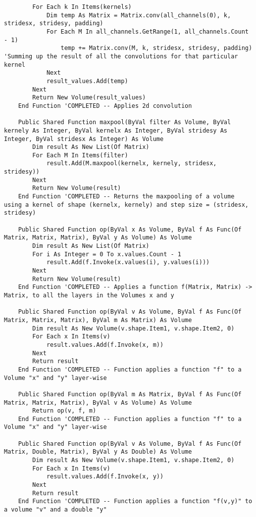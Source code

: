 \begin{verbatim}
        For Each k In Items(kernels)
            Dim temp As Matrix = Matrix.conv(all_channels(0), k, stridesx, stridesy, padding)
            For Each M In all_channels.GetRange(1, all_channels.Count - 1)
                temp += Matrix.conv(M, k, stridesx, stridesy, padding) 'Summing up the result of all the convolutions for that particular kernel
            Next
            result_values.Add(temp)
        Next
        Return New Volume(result_values)
    End Function 'COMPLETED -- Applies 2d convolution

    Public Shared Function maxpool(ByVal filter As Volume, ByVal kernely As Integer, ByVal kernelx As Integer, ByVal stridesy As Integer, ByVal stridesx As Integer) As Volume
        Dim result As New List(Of Matrix)
        For Each M In Items(filter)
            result.Add(M.maxpool(kernelx, kernely, stridesx, stridesy))
        Next
        Return New Volume(result)
    End Function 'COMPLETED -- Returns the maxpooling of a volume using a kernel of shape (kernelx, kernely) and step size = (stridesx, stridesy)

    Public Shared Function op(ByVal x As Volume, ByVal f As Func(Of Matrix, Matrix, Matrix), ByVal y As Volume) As Volume
        Dim result As New List(Of Matrix)
        For i As Integer = 0 To x.values.Count - 1
            result.Add(f.Invoke(x.values(i), y.values(i)))
        Next
        Return New Volume(result)
    End Function 'COMPLETED -- Applies a function f(Matrix, Matrix) -> Matrix, to all the layers in the Volumes x and y

    Public Shared Function op(ByVal v As Volume, ByVal f As Func(Of Matrix, Matrix, Matrix), ByVal m As Matrix) As Volume
        Dim result As New Volume(v.shape.Item1, v.shape.Item2, 0)
        For Each x In Items(v)
            result.values.Add(f.Invoke(x, m))
        Next
        Return result
    End Function 'COMPLETED -- Function applies a function "f" to a Volume "x" and "y" layer-wise

    Public Shared Function op(ByVal m As Matrix, ByVal f As Func(Of Matrix, Matrix, Matrix), ByVal v As Volume) As Volume
        Return op(v, f, m)
    End Function 'COMPLETED -- Function applies a function "f" to a Volume "x" and "y" layer-wise

    Public Shared Function op(ByVal v As Volume, ByVal f As Func(Of Matrix, Double, Matrix), ByVal y As Double) As Volume
        Dim result As New Volume(v.shape.Item1, v.shape.Item2, 0)
        For Each x In Items(v)
            result.values.Add(f.Invoke(x, y))
        Next
        Return result
    End Function 'COMPLETED -- Function applies a function "f(v,y)" to a volume "v" and a double "y"


\end{verbatim}
